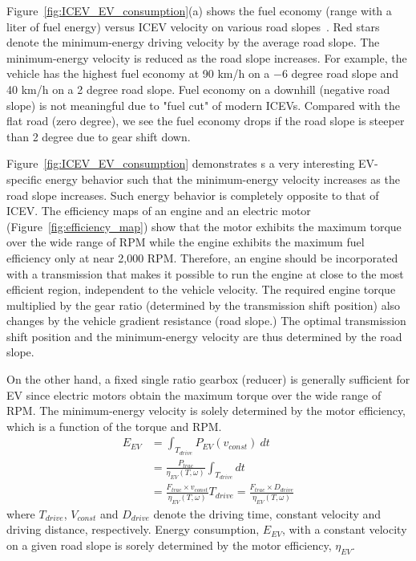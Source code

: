 \documentclass{IEEEtran}
\begin{document}
Figure~\ref{fig:ICEV_EV_consumption}(a) shows the fuel economy (range with a liter of fuel energy) versus ICEV velocity on various road slopes~\cite{Hooker:TR88}. Red stars denote  the minimum-energy driving velocity by the average road slope. The minimum-energy velocity is reduced as the road slope increases. For example, the vehicle has the highest fuel economy at 90 km/h on  a $-6$ degree road slope and 40 km/h on a 2 degree road slope.  Fuel economy on a downhill (negative road slope) is not meaningful due to "fuel cut" of modern ICEVs. Compared with the flat road (zero degree), we see the fuel economy drops if the road slope is steeper than 2 degree due to gear shift down.

Figure~\ref{fig:ICEV_EV_consumption} demonstrates s a very interesting EV-specific energy behavior such that the minimum-energy velocity increases as the road slope increases. Such energy behavior is completely opposite to that of ICEV. 
%
The efficiency maps of an  engine and an electric motor (Figure~\ref{fig:efficiency_map}) show that the motor exhibits  the maximum torque over the wide range of RPM while the engine exhibits the maximum fuel efficiency only at near 2,000 RPM. Therefore, an engine should be incorporated with a transmission that makes it possible to run the engine at close to the most efficient region, independent to the vehicle velocity. The required engine torque multiplied by the gear ratio (determined by the transmission shift position) also changes by the vehicle gradient resistance (road slope.) The optimal  transmission shift position and the minimum-energy velocity are thus determined by the road slope.

On the other hand, a fixed single ratio gearbox (reducer) is generally sufficient for EV since electric motors obtain the maximum torque over the wide range of RPM. The minimum-energy velocity is solely determined by the motor efficiency, which is a function of the torque and RPM. 
%
\begin{align}
E_{EV} 	&= \int_{T_{drive}} P_{EV}(v_{const})~dt \nonumber\\
		&= \frac{P_{trac}}{\eta_{EV}(T, \omega)} \int_{T_{drive}} dt  \nonumber\\
		&= \frac{F_{trac} \times v_{const}}{\eta_{EV}(T, \omega)} T_{drive}
		= \frac{F_{trac} \times D_{drive}}{\eta_{EV}(T, \omega)} \nonumber
\end{align}
where $T_{drive}$, $V_{const}$ and $D_{drive}$ denote the driving time, constant velocity and driving distance, respectively. Energy consumption, $E_{EV}$, with a constant velocity on a given road slope is sorely determined by the motor efficiency, $\eta_{EV}$. 
\end{document}
